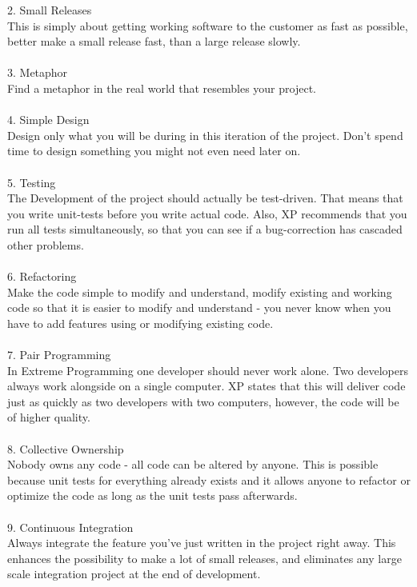 2. Small Releases\\
This is simply about getting working software to the customer as fast as possible, better make a small release fast, than a large release slowly.\\
 \\
3. Metaphor\\
Find a metaphor in the real world that resembles your project.\\
 \\
4. Simple Design\\
Design only what you will be during in this iteration of the project. Don't spend time to design something you might not even need later on.\\
 \\
5. Testing\\
The Development of the project should actually be test-driven. That means that you write unit-tests before you write actual code. Also, XP recommends that you run all tests simultaneously, so that you can see if a bug-correction has cascaded other problems.\\
 \\
6. Refactoring\\
Make the code simple to modify and understand, modify existing and working code so that it is easier to modify and understand - you never know when you have to add features using or modifying existing code.\\
 \\
7. Pair Programming\\
In Extreme Programming one developer should never work alone. Two developers always work alongside on a single computer. XP states that this will deliver code just as quickly as two developers with two computers, however, the code will be of higher quality.\\
 \\
8. Collective Ownership\\
Nobody owns any code - all code can be altered by anyone. This is possible because unit tests for everything already exists and it allows anyone to refactor or optimize the code as long as the unit tests pass afterwards.\\
 \\
9. Continuous Integration\\
Always integrate the feature you've just written in the project right away. This enhances the possibility to make a lot of small releases, and eliminates any large scale integration project at the end of development.\\

